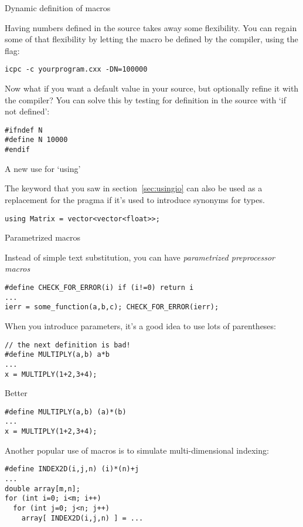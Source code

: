  {Dynamic definition of macros}

Having numbers defined in the source takes away some flexibility.
You can regain some of that flexibility by letting the macro
be defined by the compiler, using the  flag:
\begin{verbatim}
icpc -c yourprogram.cxx -DN=100000
\end{verbatim}

Now what if you want a default value in your source,
but optionally refine it with the compiler?
You can solve this by testing for definition
in the source with  `if not defined':
\begin{lstlisting}
#ifndef N
#define N 10000
#endif
\end{lstlisting}

 {A new use for `using'}

The  keyword that you saw in section~\ref{sec:usingio}
can also be used as a replacement for the  pragma
if it's used to introduce synonyms for types.
\begin{lstlisting}
using Matrix = vector<vector<float>>;
\end{lstlisting}

 {Parametrized macros}
\label{sec:cpp-define-fun}

Instead of simple text substitution, you can have
%
\emph{parametrized preprocessor macros}
\begin{lstlisting}
#define CHECK_FOR_ERROR(i) if (i!=0) return i
...
ierr = some_function(a,b,c); CHECK_FOR_ERROR(ierr);
\end{lstlisting}

When you introduce parameters, it's a good idea to use lots of parentheses:
\begin{lstlisting}
// the next definition is bad!
#define MULTIPLY(a,b) a*b
...
x = MULTIPLY(1+2,3+4);
\end{lstlisting}
Better
\begin{lstlisting}
#define MULTIPLY(a,b) (a)*(b)
...
x = MULTIPLY(1+2,3+4);
\end{lstlisting}

Another popular use of macros is to simulate multi-dimensional indexing:
\begin{lstlisting}
#define INDEX2D(i,j,n) (i)*(n)+j
...
double array[m,n];
for (int i=0; i<m; i++)
  for (int j=0; j<n; j++)
    array[ INDEX2D(i,j,n) ] = ...
\end{lstlisting}


